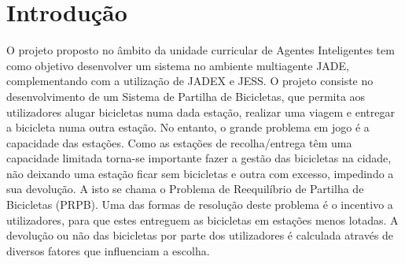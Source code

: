 \section{Introdução}\label{sec:Introduction}

O projeto proposto no âmbito da unidade curricular de Agentes Inteligentes tem como objetivo desenvolver um sistema no ambiente multiagente JADE, complementando com a utilização de JADEX e JESS.
O projeto consiste no desenvolvimento de um Sistema de Partilha de Bicicletas, que permita aos utilizadores alugar bicicletas numa dada estação, realizar uma viagem e entregar a bicicleta numa outra estação. No entanto, o grande problema em jogo é a capacidade das estações. Como as estações de recolha/entrega têm uma capacidade limitada torna-se importante fazer a gestão das bicicletas na cidade, não deixando uma estação ficar sem bicicletas e outra com excesso, impedindo a sua devolução. A isto se chama o Problema de Reequilíbrio de Partilha de Bicicletas (PRPB). Uma das formas de resolução deste problema é o incentivo a utilizadores, para que estes entreguem as bicicletas em estações menos lotadas. A devolução ou não das bicicletas por parte dos utilizadores é calculada através de diversos fatores que influenciam a escolha.